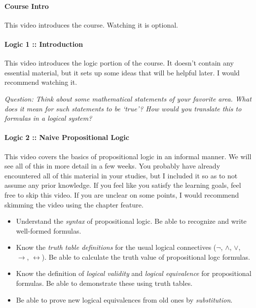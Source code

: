 \documentclass{article}[12pt]
\begin{document}
\paragraph{Course Intro} This video introduces the course. Watching it is optional.

\paragraph{Logic 1 :: Introduction} This video introduces the logic portion of the course. It doesn't contain any essential material, but it sets up some ideas that will be helpful later. I would recommend watching it.

\emph{Question: Think about some mathematical statements of your favorite area. What does it mean for such statements to be `true'? How would you translate this to formulas in a logical system?}

\paragraph{Logic 2 :: Naive Propositional Logic} This video covers the basics of propositional logic in an informal manner. We will see all of this in more detail in a few weeks. You probably have already encountered all of this material in your studies, but I included it so as to not assume any prior knowledge. If you feel like you satisfy the learning goals, feel free to skip this video. If you are unclear on some points, I would recommend skimming the video using the chapter feature.
\begin{itemize}
    \item[\twemoji{slightly smiling face}] Understand the \emph{syntax} of propositional logic. Be able to recognize and write well-formed formulas.
    \item[\twemoji{slightly smiling face}] Know the \emph{truth table definitions} for the usual logical connectives ($\neg$, $\wedge$, $\vee$, $\rightarrow$, $\leftrightarrow$). Be able to calculate the truth value of propositional logc formulas.
    \item[\twemoji{slightly smiling face}] Know the definition of \emph{logical validity} and \emph{logical equivalence} for propositional formulas. Be able to demonstrate these using truth tables.
    \item[\twemoji{slightly smiling face}] Be able to prove new logical equivalences from old ones by \emph{substitution}.
\end{itemize}
\end{document}
